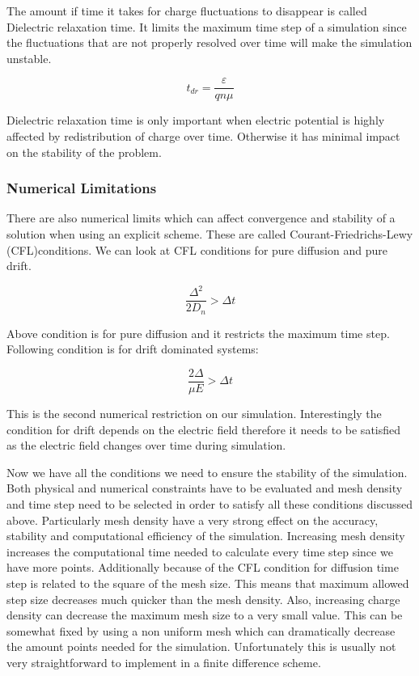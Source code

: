 The amount if time it takes for charge fluctuations to disappear is called Dielectric relaxation time. It limits the maximum time step of a simulation since the fluctuations that are not properly resolved over time will make the simulation unstable.

\begin{equation}
t_{dr}=\frac{\varepsilon}{q n \mu}
\end{equation}

Dielectric relaxation time is only important when electric potential is highly affected by redistribution of charge over time. Otherwise it has minimal impact on the stability of the problem.
\subsubsection{Numerical Limitations}

There are also numerical limits which can affect convergence and stability of a solution when using an explicit scheme. These are called Courant-Friedrichs-Lewy (CFL)conditions. We can look at CFL conditions for pure diffusion and pure drift.

\begin{equation}
\frac{\Delta ^2}{2 D_n}>\Delta t
\end{equation}

Above condition is for pure diffusion and it restricts the maximum time step. Following condition is for drift dominated systems:

\begin{equation}
\frac{2 \Delta }{\mu E}>\Delta t
\end{equation}

This is the second numerical restriction on our simulation. Interestingly the condition for drift depends on the electric field therefore it needs to be satisfied as the electric field changes over time during simulation.

Now we have all the conditions we need to ensure the stability of the simulation. Both physical and numerical constraints have to be evaluated and mesh density and time step need to be selected in order to satisfy all these conditions discussed above. Particularly mesh density have a very strong effect on the accuracy, stability and computational efficiency of the simulation. Increasing mesh density increases the computational time needed to calculate every time step since we have more points. Additionally because of the CFL condition for diffusion time step is related to the square of the mesh size. This means that maximum allowed step size decreases much quicker than the mesh density. Also, increasing charge density can decrease the maximum mesh size to a very small value. This can be somewhat fixed by using a non uniform mesh which can dramatically decrease the amount points needed for the simulation. Unfortunately this is usually not very straightforward to implement in a finite difference scheme. 

